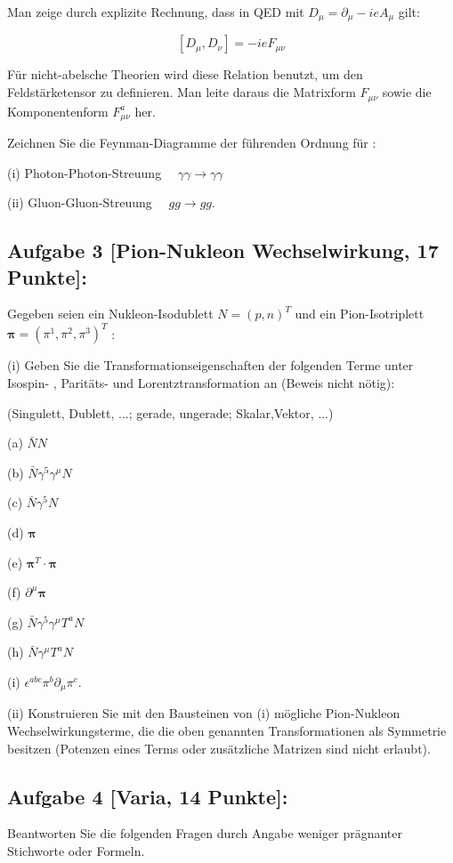 \documentclass[10pt, letterpaper]{article}
\begin{document}
Man zeige durch explizite Rechnung, dass in QED mit $D_\mu=\partial_\mu-i e A_\mu$ gilt:

$$
\left[D_\mu, D_\nu\right]=-i e F_{\mu \nu}
$$


Für nicht-abelsche Theorien wird diese Relation benutzt, um den Feldstärketensor zu definieren. Man leite daraus die Matrixform $F_{\mu \nu}$ sowie die Komponentenform $F_{\mu \nu}^a$ her.

Zeichnen Sie die Feynman-Diagramme der führenden Ordnung für :

(i) Photon-Photon-Streuung $\quad \gamma \gamma \longrightarrow \gamma \gamma$

(ii) Gluon-Gluon-Streuung $\quad g g \longrightarrow g g$.


\subsection{Aufgabe 3 [Pion-Nukleon Wechselwirkung, 17 Punkte]:}

Gegeben seien ein Nukleon-Isodublett $N=(p, n)^T$ und ein Pion-Isotriplett $\boldsymbol{\pi}=\left(\pi^1, \pi^2, \pi^3\right)^T$ :

(i) Geben Sie die Transformationseigenschaften der folgenden Terme unter Isospin- , Paritäts- und Lorentztransformation an (Beweis nicht nötig):

(Singulett, Dublett, ...; gerade, ungerade; Skalar,Vektor, ...)

(a) $\bar{N} N$

(b) $\bar{N} \gamma^5 \gamma^\mu N$

(c) $\bar{N} \gamma^5 N$

(d) $\boldsymbol{\pi}$

(e) $\boldsymbol{\pi}^T \cdot \boldsymbol{\pi}$

(f) $\partial^\mu \boldsymbol{\pi}$

(g) $\bar{N} \gamma^5 \gamma^\mu T^a N$

(h) $\bar{N} \gamma^\mu T^a N$

(i) $\epsilon^{a b c} \pi^b \partial_\mu \pi^c$.

(ii) Konstruieren Sie mit den Bausteinen von (i) mögliche Pion-Nukleon Wechselwirkungsterme, die die oben genannten Transformationen als Symmetrie besitzen (Potenzen eines Terms oder zusätzliche Matrizen sind nicht erlaubt).

\subsection{Aufgabe 4 [Varia, 14 Punkte]:}
Beantworten Sie die folgenden Fragen durch Angabe weniger prägnanter Stichworte oder Formeln.
\end{document}
